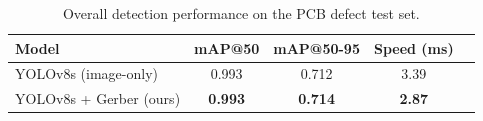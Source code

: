 \begin{table}[t]
\centering
\caption{Overall detection performance on the PCB defect test set.}
\label{tab:overall}
\begin{tabular}{lcccc}
\toprule
\textbf{Model} & \textbf{mAP@50} & \textbf{mAP@50-95} & \textbf{Speed (ms)} \\
\midrule
YOLOv8s (image-only)       & 0.993 & 0.712 & 3.39 \\
YOLOv8s + Gerber (ours)    & \textbf{0.993} & \textbf{0.714} & \textbf{2.87} \\
\bottomrule
\end{tabular}
\end{table}

